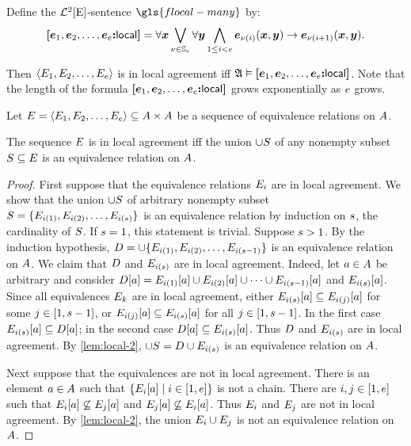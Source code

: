 \begin{definition}
Define the $\mathcal{L}^{2}[\mathrm{E}]$-sentence $\gls{flocal-many}$ by:
\[
  {\bm{[}\bm{e}_{1},\bm{e}_{2},\dots,\bm{e}_{e}\mathord{\bm{:}}\mathsf{local}\bm{]}} = \forall\bm{x}
  \bigvee_{\nu \in \mathbb{S}_{e}}
  \forall\bm{y} \bigwedge_{1 \leq i < e}
  \bm{e}_{\nu(i)}(\bm{x},\bm{y}) \rightarrow \bm{e}_{\nu(i+1)}(\bm{x},\bm{y}).
\]
\end{definition}
Then $\left\langle E_{1},E_{2},\dots,E_{e} \right\rangle$ is in local agreement iff
$\mathfrak{A} \vDash {\bm{[}\bm{e}_{1},\bm{e}_{2},\dots,\bm{e}_{e}\mathord{\bm{:}}\mathsf{local}\bm{]}}$.
Note that the length of the formula ${\bm{[}\bm{e}_{1},\bm{e}_{2},\dots,\bm{e}_{e}\mathord{\bm{:}}\mathsf{local}\bm{]}}$ grows
exponentially as $e$ grows.

Let $E = \left\langle E_{1},E_{2},\dots,E_{e} \right\rangle \subseteq {A\times A}$
be a sequence of equivalence relations on $A$.
\begin{theorem}\label{thm:local}
The sequence $E$ is in local agreement iff
the union $\cup S$ of any nonempty subset $S \subseteq E$
is an equivalence relation on $A$.
\end{theorem}
\begin{proof}
First suppose that the equivalence relations $E_{i}$ are in local agreement.
We show that the union $\cup S$ of arbitrary nonempty subset 
$S = \{E_{i(1)}, E_{i(2)}, \dots, E_{i(s)}\}$ is
an equivalence relation by induction on $s$, the cardinality of $S$. If
$s = 1$, this statement is trivial.
Suppose $s > 1$.
By the induction hypothesis, $D = \cup \{E_{i(1)},
E_{i(2)}, \dots, E_{i(s-1)}\}$ is an equivalence relation on
$A$.
We claim that $D$ and $E_{i(s)}$ are in local agreement.
Indeed, let $a \in A$ be arbitrary and consider
$D[a] = E_{i(1)}[a] \cup E_{i(2)}[a] \cup \dots \cup
E_{i(s - 1)}[a]$ and $E_{i(s)}[a]$.
Since all equivalences $E_{k}$
are in local agreement, either
$E_{i(s)}[a] \subseteq E_{i(j)}[a]$ 
for some $j \in [1, s-1]$,
or $E_{i(j)}[a] \subseteq E_{i(s)}[a]$
for all $j \in [1, s-1]$.
In the first case $E_{i(s)}[a] \subseteq D[a]$;
in the second case $D[a] \subseteq E_{i(s)}[a]$.
Thus $D$ and $E_{i(s)}$ are in local agreement.
By \cref{lem:local-2}, $\cup S = D \cup E_{i(s)}$ is an
equivalence relation on $A$.

Next suppose that the equivalences are not in local agreement.
There is an element $a \in A$ such that
$\left\{E_{i}[a]\mathrel{}\middle|\mathrel{}i \in [1, e]\right\}$ is not a chain. 
There are $i, j \in [1, e]$ such that
$E_{i}[a] \not\subseteq E_{j}[a]$ and
$E_{j}[a] \not\subseteq E_{i}[a]$.
Thus $E_{i}$ and $E_{j}$ are not in local agreement.
By \cref{lem:local-2}, the union $E_{i} \cup E_{j}$ is not an
equivalence relation on $A$.
\end{proof}

